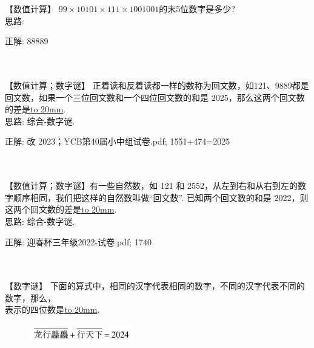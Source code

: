 \item {
    【数值计算】
    $99\times 10101\times 111\times 1001001$的末5位数字是多少?
    \ifshowSolution
        \fangsong{}
        \\
        思路:

        正解: 88889
    \else
        \\ \\ \\
    \fi
}

\item {
    【数值计算；数字谜】
    正着读和反着读都一样的数称为回文数，如121、9889都是回文数，如果一个三位回文数和一个四位回文数的和是 2025，那么这两个回文数的差是\underline{\hbox to 20mm{}}.
    \ifshowSolution
        \fangsong{}
        \\
        思路: 综合-数字谜.

        正解: 改  2023；YCB第40届小中组试卷.pdf; 1551+474=2025
    \else
        \\ \\ \\
    \fi
}

\item {
    【数值计算；数字谜】有一些自然数，如 121 和 2552，从左到右和从右到左的数字顺序相同，我们把这样的自然数叫做``回文数''. 已知两个回文数的和是 2022，则这两个回文数的差是\underline{\hbox to 20mm{}}.
    \ifshowSolution
        \fangsong{}
        \\
        思路: 综合-数字谜.

        正解:  迎春杯三年级2022-试卷.pdf; 1740
    \else
        \\ \\ \\
    \fi
}


\item {
    【数字谜】
    下面的算式中，相同的汉字代表相同的数字，不同的汉字代表不同的数字，那么，\\ 表示的四位数是\underline{\hbox to 20mm{}}.
    \begin{figure}[H] 
        \centering
        \includegraphics[width=0.4\textwidth]{./pics/Chapter_7/2.png}
    \end{figure}
    \vspace{1cm}
}

